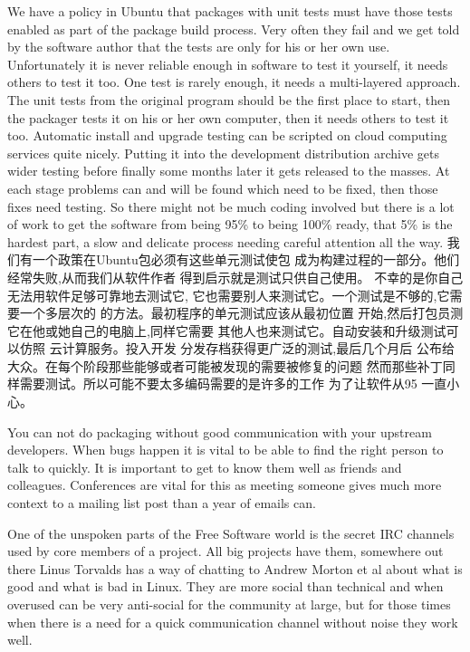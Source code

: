 We have a policy in Ubuntu that packages with unit tests must have those tests
enabled as part of the package build process. Very often they fail and we get
told by the software author that the tests are only for his or her own use.
Unfortunately it is never reliable enough in software to test it yourself, it
needs others to test it too. One test is rarely enough, it needs a multi-layered
approach. The unit tests from the original program should be the first place to
start, then the packager tests it on his or her own computer, then it needs
others to test it too. Automatic install and upgrade testing can be scripted on
cloud computing services quite nicely. Putting it into the development
distribution archive gets wider testing before finally some months later it gets
released to the masses. At each stage problems can and will be found which need
to be fixed, then those fixes need testing. So there might not be much coding
involved but there is a lot of work to get the software from being 95\% to being
100\% ready, that 5\% is the hardest part, a slow and delicate process needing
careful attention all the way.
我们有一个政策在Ubuntu包必须有这些单元测试使包
成为构建过程的一部分。他们经常失败,从而我们从软件作者
得到启示就是测试只供自己使用。
不幸的是你自己无法用软件足够可靠地去测试它,
它也需要别人来测试它。一个测试是不够的,它需要一个多层次的
的方法。最初程序的单元测试应该从最初位置
开始,然后打包员测它在他或她自己的电脑上,同样它需要
其他人也来测试它。自动安装和升级测试可以仿照
云计算服务。投入开发
分发存档获得更广泛的测试,最后几个月后
公布给大众。在每个阶段那些能够或者可能被发现的需要被修复的问题
然而那些补丁同样需要测试。所以可能不要太多编码需要的是许多的工作
为了让软件从95%
一直小心。

You can not do packaging without good communication with your upstream
developers. When bugs happen it is vital to be able to find the right person to
talk to quickly. It is important to get to know them well as friends and
colleagues. Conferences are vital for this as meeting someone gives much more
context to a mailing list post than a year of emails can. 

One of the unspoken parts of the Free Software world is the secret IRC channels
used by core members of a project. All big projects have them, somewhere out
there Linus Torvalds has a way of chatting to Andrew Morton et al about what is
good and what is bad in Linux. They are more social than technical and when
overused can be very anti-social for the community at large, but for those times
when there is a need for a quick communication channel without noise they work
well.

